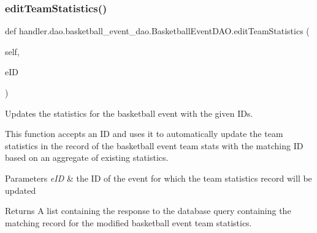 \subsubsection{\texorpdfstring{edit\+Team\+Statistics()}{editTeamStatistics()}}
{\footnotesize\ttfamily def handler.\+dao.\+basketball\+\_\+event\+\_\+dao.\+Basketball\+Event\+D\+A\+O.\+edit\+Team\+Statistics (\begin{DoxyParamCaption}\item[{}]{self,  }\item[{}]{e\+ID }\end{DoxyParamCaption})}



Updates the statistics for the basketball event with the given I\+Ds. 

This function accepts an ID and uses it to automatically update the team statistics in the record of the basketball event team stats with the matching ID based on an aggregate of existing statistics.


\begin{DoxyParams}{Parameters}
{\em e\+ID} & the ID of the event for which the team statistics record will be updated\\
\hline
\end{DoxyParams}
\begin{DoxyReturn}{Returns}
A list containing the response to the database query containing the matching record for the modified basketball event team statistics. 
\end{DoxyReturn}
\mbox{\label{classhandler_1_1dao_1_1basketball__event__dao_1_1_basketball_event_d_a_o_ae4da53a36598f6235bfe799577c41c0d}} 
